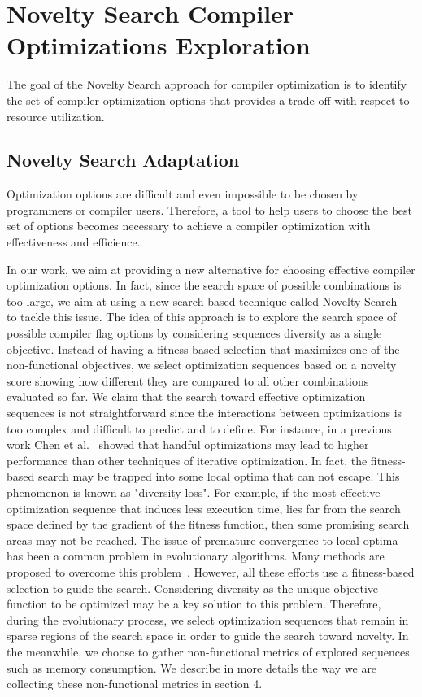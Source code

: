 \section{Novelty Search Compiler Optimizations Exploration}
 
The goal of the Novelty Search approach for compiler optimization is to identify the set of compiler optimization options that provides a trade-off with respect to resource utilization. 

\subsection{Novelty Search Adaptation}
Optimization options are difficult and even impossible to be chosen by programmers or compiler users.
Therefore, a tool to help users to choose the best set of options becomes necessary to achieve a compiler optimization with effectiveness and efficience. 

In our work, we aim at providing a new alternative for choosing effective compiler optimization options. 
In fact, since the search space of possible combinations is too large, we aim at using a new search-based technique called Novelty Search~\cite{lehman2008exploiting} to tackle this issue. 
The idea of this approach is to explore the search space of possible compiler flag options by considering sequences diversity as a single objective. 
Instead of having a fitness-based selection that maximizes one of the non-functional objectives, we select optimization sequences based on a novelty score showing how different they are compared to all other combinations evaluated so far. 
We claim that the search toward effective optimization sequences is not straightforward since the interactions between optimizations is too complex and difficult to predict and to define. 
For instance, in a previous work Chen et al.~\cite{chen2012deconstructing} showed that handful optimizations may lead to higher performance than other techniques of iterative optimization. 
In fact, the fitness-based search may be trapped into some local optima that can not escape. 
This phenomenon is known as "diversity loss". For example, if the most effective optimization sequence that induces less execution time, lies far from the search space defined by the gradient of the fitness function, then some promising search areas may not be reached. 
The issue of premature convergence to local optima has been a common problem in evolutionary algorithms. 
Many methods are proposed to overcome this problem~\cite{banzhaf1996effect,gathercole1996adverse}. 
However, all these efforts use a fitness-based selection to guide the search. Considering diversity as the unique objective function to be optimized may be a key solution to this problem.
Therefore, during the evolutionary process, we select optimization sequences that remain in sparse regions of the search space in order to guide the search toward novelty. 
In the meanwhile, we choose to gather non-functional metrics of explored sequences such as memory consumption. 
We describe in more details the way we are collecting these non-functional metrics in section 4.

